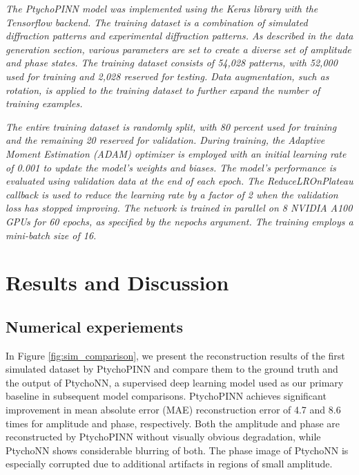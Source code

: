 \documentclass[sn-mathphys]{sn-jnl}%
\theoremstyle{thmstyleone}%
\theoremstyle{thmstyletwo}%
\theoremstyle{thmstylethree}%
\begin{document}
\emph{The PtychoPINN model was implemented using the Keras library with the Tensorflow backend. The training dataset is a combination of simulated diffraction patterns and experimental diffraction patterns. As described in the data generation section, various parameters are set to create a diverse set of amplitude and phase states. The training dataset consists of 54,028 patterns, with 52,000 used for training and 2,028 reserved for testing. Data augmentation, such as rotation, is applied to the training dataset to further expand the number of training examples.}

\emph{The entire training dataset is randomly split, with 80 percent used for training and the remaining 20 reserved for validation. During training, the Adaptive Moment Estimation (ADAM) optimizer is employed with an initial learning rate of 0.001 to update the model's weights and biases. The model's performance is evaluated using validation data at the end of each epoch. The ReduceLROnPlateau callback is used to reduce the learning rate by a factor of 2 when the validation loss has stopped improving. The network is trained in parallel on 8 NVIDIA A100 GPUs for 60 epochs, as specified by the nepochs argument. The training employs a mini-batch size of 16.}



\section{Results and Discussion}

\subsection{Numerical experiements}

In Figure \ref{fig:sim_comparison}, we present the reconstruction results of the first simulated dataset by PtychoPINN and compare them to the ground truth and the output of PtychoNN, a supervised deep learning model used as our primary baseline in subsequent model comparisons. PtychoPINN achieves significant improvement in mean absolute error (MAE) reconstruction error of 4.7 and 8.6 times for amplitude and phase, respectively. Both the amplitude and phase are reconstructed by PtychoPINN without visually obvious degradation, while PtychoNN shows considerable blurring of both. The phase image of PtychoNN is especially corrupted due to additional artifacts in regions of small amplitude.
\end{document}
